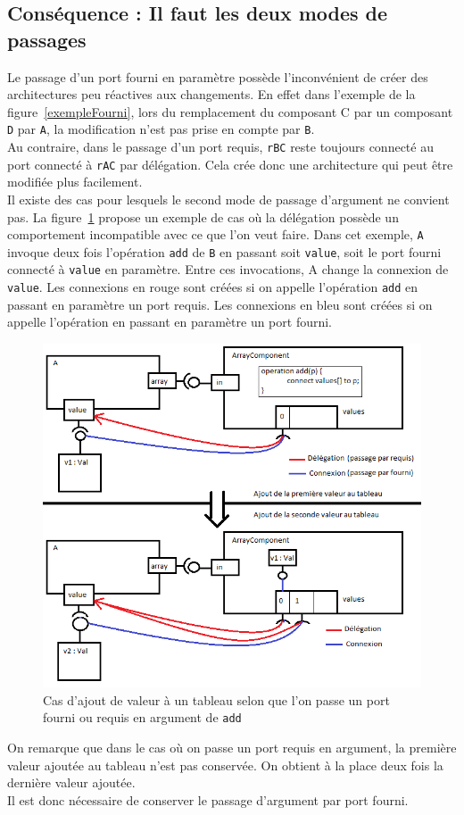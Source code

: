 \documentclass[11pt,a4paper,openany,oneside]{book}
\begin{document}
\subsection{Conséquence : Il faut les deux modes de passages}
Le passage d'un port fourni en paramètre possède l'inconvénient de créer des architectures peu réactives aux changements. En effet dans l'exemple de la figure~\ref{exempleFourni}, lors du remplacement du composant C par un composant \texttt{D} par \texttt{A}, la modification n'est pas prise en compte par \texttt{B}.\\
Au contraire, dans le passage d'un port requis, \texttt{rBC} reste toujours connecté au port connecté à \texttt{rAC} par délégation. Cela crée donc une architecture qui peut être modifiée plus facilement.\\
Il existe des cas pour lesquels le second mode de passage d'argument ne convient pas. La figure~\ref{arrayConnexion} propose un exemple de cas où la délégation possède un comportement incompatible avec ce que l'on veut faire. Dans cet exemple, \texttt{A} invoque deux fois l'opération \texttt{add} de \texttt{B} en passant soit \texttt{value}, soit le port fourni connecté à \texttt{value} en paramètre. Entre ces invocations, A change la connexion de \texttt{value}. Les connexions en rouge sont créées si on appelle l'opération \texttt{add} en passant en paramètre un port requis. Les connexions en bleu sont créées si on appelle l'opération en passant en paramètre un port fourni.\\
\begin{figure}[H]
\centering
\includegraphics[scale=0.7, keepaspectratio=true]{arrayConnexion.png}
\caption{Cas d'ajout de valeur à un tableau selon que l'on passe un port fourni ou requis en argument de \texttt{add}}
\label{arrayConnexion}
\end{figure}
On remarque que dans le cas où on passe un port requis en argument, la première valeur ajoutée au tableau n'est pas conservée. On obtient à la place deux fois la dernière valeur ajoutée.\\
Il est donc nécessaire de conserver le passage d'argument par port fourni.
\end{document}
